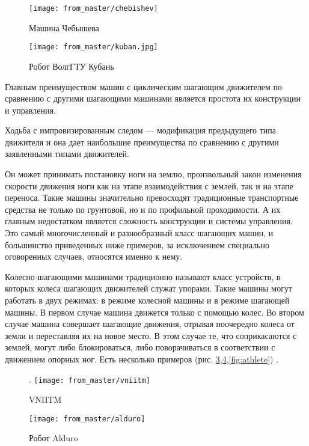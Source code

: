 \begin{figure}[H]
\centering\texttt{[image: from\_master/chebishev]}
\caption{Машина Чебышева}
\label{fig:chebishev}
\end{figure}

\begin{figure}[H]
\centering\texttt{[image: from\_master/kuban.jpg]}
\caption{Робот ВолгГТУ Кубань}
\label{fig:kuban}
\end{figure}

Главным преимуществом машин с циклическим шагающим движителем по сравнению с другими шагающими машинами является простота их конструкции и управления.

Ходьба с импровизированным следом --- модификация предыдущего типа движителя и она дает наибольшие преимущества по сравнению с другими заявленными типами движителей. 

Он может принимать постановку ноги на землю, произвольный закон изменения скорости движения ноги как на этапе взаимодействия с землей, так и на этапе переноса. Такие машины значительно превосходят традиционные транспортные средства не только по грунтовой, но и по профильной проходимости. А их главным недостатком является сложность конструкции и системы управления. Это самый многочисленный и разнообразный класс шагающих машин, и большинство приведенных ниже примеров, за исключением специально оговоренных случаев, относятся именно к нему.

Колесно-шагающими машинами традиционно называют класс устройств, в которых колеса шагающих движителей служат упорами. Такие машины могут работать в двух режимах: в режиме колесной машины и в режиме шагающей машины. В первом случае машина движется только с помощью колес. Во втором случае машина совершает шагающие движения, отрывая поочередно колеса от земли и переставляя их на новое место. В этом случае те, что соприкасаются с землей, могут либо блокироваться, либо поворачиваться в соответствии с движением опорных ног.
Есть несколько примеров (рис. \ref{fig:vniitm},\ref{fig:alduro},\ref{fig:athlete}) \cite{germann2001joystick}.

\begin{figure}[H].
\centering\texttt{[image: from\_master/vniitm]}
\caption{VNIITM}
\label{fig:vniitm}
\end{figure}

\begin{figure}[H]
\centering\texttt{[image: from\_master/alduro]}
\caption{Робот Alduro}
\label{fig:alduro}
\end{figure}

